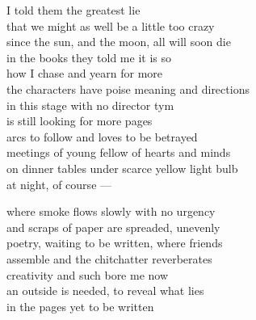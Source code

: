 I told them the greatest lie\\
that we might as well be a little too crazy\\
since the sun, and the moon, all will soon die\\
in the books they told me it is so\\
how I chase and yearn for more\\

the characters have poise meaning and directions\\
in this stage with no director tym\\
is still looking for more pages\\
arcs to follow and loves to be betrayed\\
meetings of young fellow of hearts and minds\\
on dinner tables under scarce yellow light bulb\\
at night, of course ---

where smoke flows slowly with no urgency\\
and scraps of paper are spreaded, unevenly\\
poetry, waiting to be written, where friends\\
assemble and the chitchatter reverberates\\
creativity and such bore me now\\
an outside is needed, to reveal what lies\\
in the pages yet to be written\\
